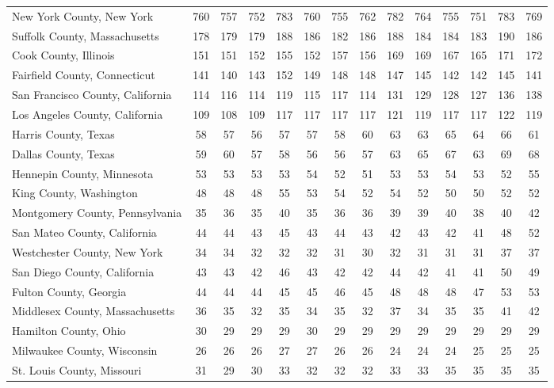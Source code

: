 \begin{landscape}
\begin{longtable}{lccccccccccccc}
	New York County, New York & 760 & 757 & 752 & 783 & 760 & 755 & 762 & 782 & 764 & 755 & 751 & 783 & 769 \\
	Suffolk County, Massachusetts & 178 & 179 & 179 & 188 & 186 & 182 & 186 & 188 & 184 & 184 & 183 & 190 & 186 \\
	Cook County, Illinois & 151 & 151 & 152 & 155 & 152 & 157 & 156 & 169 & 169 & 167 & 165 & 171 & 172 \\
	Fairfield County, Connecticut & 141 & 140 & 143 & 152 & 149 & 148 & 148 & 147 & 145 & 142 & 142 & 145 & 141 \\
	San Francisco County, California & 114 & 116 & 114 & 119 & 115 & 117 & 114 & 131 & 129 & 128 & 127 & 136 & 138 \\
	Los Angeles County, California & 109 & 108 & 109 & 117 & 117 & 117 & 117 & 121 & 119 & 117 & 117 & 122 & 119 \\
	Harris County, Texas & 58 & 57 & 56 & 57 & 57 & 58 & 60 & 63 & 63 & 65 & 64 & 66 & 61 \\
	Dallas County, Texas & 59 & 60 & 57 & 58 & 56 & 56 & 57 & 63 & 65 & 67 & 63 & 69 & 68 \\
	Hennepin County, Minnesota & 53 & 53 & 53 & 53 & 54 & 52 & 51 & 53 & 53 & 54 & 53 & 52 & 55 \\
	King County, Washington & 48 & 48 & 48 & 55 & 53 & 54 & 52 & 54 & 52 & 50 & 50 & 52 & 52 \\
	Montgomery County, Pennsylvania & 35 & 36 & 35 & 40 & 35 & 36 & 36 & 39 & 39 & 40 & 38 & 40 & 42 \\
	San Mateo County, California & 44 & 44 & 43 & 45 & 43 & 44 & 43 & 42 & 43 & 42 & 41 & 48 & 52 \\
	Westchester County, New York & 34 & 34 & 32 & 32 & 32 & 31 & 30 & 32 & 31 & 31 & 31 & 37 & 37 \\
	San Diego County, California & 43 & 43 & 42 & 46 & 43 & 42 & 42 & 44 & 42 & 41 & 41 & 50 & 49 \\
	Fulton County, Georgia & 44 & 44 & 44 & 45 & 45 & 46 & 45 & 48 & 48 & 48 & 47 & 53 & 53 \\
	Middlesex County, Massachusetts & 36 & 35 & 32 & 35 & 34 & 35 & 32 & 37 & 34 & 35 & 35 & 41 & 42 \\
	Hamilton County, Ohio & 30 & 29 & 29 & 29 & 30 & 29 & 29 & 29 & 29 & 29 & 29 & 29 & 29 \\
	Milwaukee County, Wisconsin & 26 & 26 & 26 & 27 & 27 & 26 & 26 & 24 & 24 & 24 & 25 & 25 & 25 \\
	St. Louis County, Missouri & 31 & 29 & 30 & 33 & 32 & 32 & 32 & 33 & 33 & 35 & 35 & 35 & 35 \\

\end{longtable}
\end{landscape}
